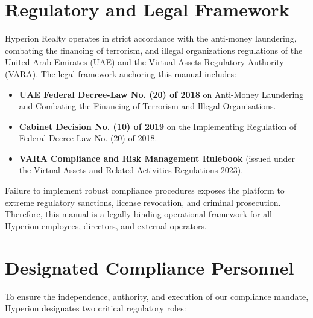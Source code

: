 \documentclass[11pt]{article}
\begin{document}

\newpage
{}
\tableofcontents
\newpage

\setcounter{page}{1}

\section{Regulatory and Legal Framework}
Hyperion Realty operates in strict accordance with the anti-money laundering, combating the financing of terrorism, and illegal organizations regulations of the United Arab Emirates (UAE) and the Virtual Assets Regulatory Authority (VARA). The legal framework anchoring this manual includes:
\begin{itemize}
    \item \textbf{UAE Federal Decree-Law No. (20) of 2018} on Anti-Money Laundering and Combating the Financing of Terrorism and Illegal Organisations.
    \item \textbf{Cabinet Decision No. (10) of 2019} on the Implementing Regulation of Federal Decree-Law No. (20) of 2018.
    \item \textbf{VARA Compliance and Risk Management Rulebook} (issued under the Virtual Assets and Related Activities Regulations 2023).
\end{itemize}

Failure to implement robust compliance procedures exposes the platform to extreme regulatory sanctions, license revocation, and criminal prosecution. Therefore, this manual is a legally binding operational framework for all Hyperion employees, directors, and external operators.

\section{Designated Compliance Personnel}
To ensure the independence, authority, and execution of our compliance mandate, Hyperion designates two critical regulatory roles:
\end{document}
